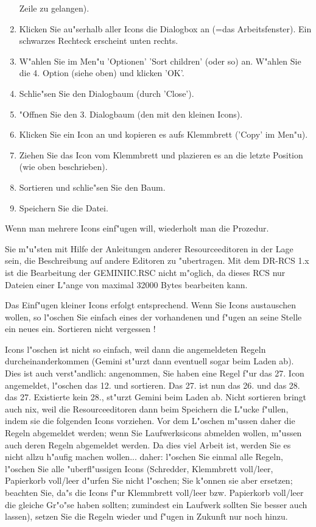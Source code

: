 \begin{enumerate}
       Zeile zu gelangen).
 \item Klicken Sie au"serhalb aller Icons die Dialogbox an (=das 
       Arbeitsfenster). Ein schwarzes Rechteck erscheint unten 
       rechts.
 \item W"ahlen Sie im Men"u 'Optionen' 'Sort children' (oder so) an.
       W"ahlen Sie die 4. Option (siehe oben) und klicken 'OK'.
 \item Schlie"sen Sie den Dialogbaum (durch 'Close').
 \item "Offnen Sie den 3. Dialogbaum (den mit den kleinen Icons).
 \item Klicken Sie ein Icon an und kopieren es aufs Klemmbrett
       ('Copy' im Men"u).
 \item Ziehen Sie das Icon vom Klemmbrett und plazieren es an die
       letzte Position (wie oben beschrieben).
 \item Sortieren und schlie"sen Sie den Baum.
 \item Speichern Sie die Datei.
\end{enumerate}

Wenn man mehrere Icons einf"ugen will, wiederholt man die Prozedur. 

Sie m"u"sten mit Hilfe
der Anleitungen anderer Resourceeditoren in der Lage sein, 
die Beschreibung auf andere Editoren zu "ubertragen. Mit dem
DR-RCS 1.x ist die Bearbeitung der GEMINIIC.RSC nicht m"oglich,
da dieses RCS nur Dateien einer L"ange von maximal 32000 Bytes 
bearbeiten kann.

Das Einf"ugen kleiner Icons erfolgt entsprechend. Wenn Sie Icons 
austauschen wollen, so l"oschen Sie einfach eines der 
vorhandenen und f"ugen an seine Stelle ein neues ein. 
Sortieren nicht vergessen !

Icons l"oschen ist nicht so einfach, weil dann die angemeldeten
Regeln durcheinanderkommen (Gemini st"urzt dann eventuell sogar beim 
Laden ab). Dies ist auch verst"andlich: angenommen, Sie
haben eine Regel f"ur das 27. Icon angemeldet, l"oschen das 
12. und sortieren. Das 27. ist nun das 26. und das 28. das 27.
Existierte kein 28., st"urzt Gemini beim Laden ab. Nicht sortieren
bringt auch nix, weil die Resourceeditoren dann beim Speichern
die L"ucke f"ullen, indem sie die folgenden Icons vorziehen. 
Vor dem L"oschen m"ussen daher die
Regeln abgemeldet werden; wenn Sie Laufwerksicons abmelden wollen,
m"ussen auch deren Regeln abgemeldet werden. Da dies viel Arbeit ist,
werden Sie es nicht allzu h"aufig machen wollen... daher: l"oschen
Sie einmal alle Regeln, l"oschen Sie alle "uberfl"ussigen Icons
(Schredder, Klemmbrett voll/leer, Papierkorb voll/leer d"urfen Sie
nicht l"oschen; Sie k"onnen sie aber ersetzen; beachten Sie, da"s
die Icons f"ur Klemmbrett voll/leer bzw. Papierkorb voll/leer die
gleiche Gr"o"se haben sollten; zumindest ein Laufwerk sollten Sie 
besser auch lassen), setzen Sie die Regeln wieder und f"ugen in 
Zukunft nur noch hinzu.

